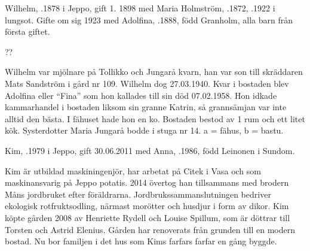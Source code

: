 %
Wilhelm, .1878 i Jeppo, gift 1. 1898 med Maria Holmström, .1872, .1922 i lungsot. Gifte om sig 1923 med Adolfina, .1888, född Granholm, alla barn från första giftet.
\begin{jhchildren}
  \item {}
  \item {}
  \item {}
  \item {}
  \item {} ??
  \item {}
\end{jhchildren}
Wilhelm var mjölnare på Tollikko och Jungarå kvarn, han var son till skräddaren Mats Sandström i gård nr 109. Wilhelm dog 27.03.1940. Kvar i bostaden blev Adolfina eller ``Fina'' som hon kallades till sin död 07.02.1958. Hon idkade kammarhandel i bostaden liksom sin granne Katrin, så grannsämjan var inte  alltid den bästa. I fähuset hade hon en ko. Bostaden bestod av 1 rum och ett litet kök. Systerdotter Maria Jungarå bodde i stuga nr 14. a = fähus, b = bastu.



%



%
Kim, .1979 i Jeppo, gift 30.06.2011 med Anna, .1986, född Leinonen i  Sundom.
\begin{jhchildren}
  \item {}
  \item {}
  \item {}
\end{jhchildren}
Kim är utbildad maskiningenjör, har arbetat på Citek i Vasa och som maskinansvarig på Jeppo potatis. 2014 övertog han tillsammans med brodern Måns jordbruket efter föräldrarna. Jordbrukssammanslutningen bedriver ekologisk rotfruktsodling, 	närmast morötter och husdjur i form av dikor. Kim köpte gården 2008 av Henriette Rydell och Louise Spillum, som är döttrar till Torsten och Astrid Elenius. Gården har renoverats från grunden till en modern bostad. Nu bor familjen i det hus som Kims farfars farfar en gång byggde.


